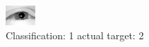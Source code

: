 \begin{figure}[h!]
\begin{center}
\includegraphics[width=0.60\columnwidth]{figures/ID2257_class_1_target_2.png}
\end{center}
\caption{ Classification: 1 actual target: 2}
\label{fig:ID2257_class_1_target_2}
\end{figure}

